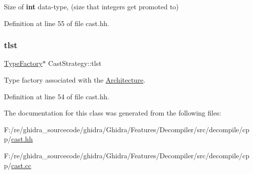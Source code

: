 Size of {\bfseries{int}} data-\/type, (size that integers get promoted to) 



Definition at line 55 of file cast.\+hh.

\mbox{\label{class_cast_strategy_a5a962dd129fd28373a43245976e3e09a}} 
\subsubsection{\texorpdfstring{tlst}{tlst}}
{\footnotesize\ttfamily \mbox{\hyperlink{class_type_factory}{Type\+Factory}}$\ast$ Cast\+Strategy\+::tlst\hspace{0.3cm}{\ttfamily [protected]}}



Type factory associated with the \mbox{\hyperlink{class_architecture}{Architecture}}. 



Definition at line 54 of file cast.\+hh.



The documentation for this class was generated from the following files\+:\begin{DoxyCompactItemize}
\item 
F\+:/re/ghidra\+\_\+sourcecode/ghidra/\+Ghidra/\+Features/\+Decompiler/src/decompile/cpp/\mbox{\hyperlink{cast_8hh}{cast.\+hh}}\item 
F\+:/re/ghidra\+\_\+sourcecode/ghidra/\+Ghidra/\+Features/\+Decompiler/src/decompile/cpp/\mbox{\hyperlink{cast_8cc}{cast.\+cc}}\end{DoxyCompactItemize}
